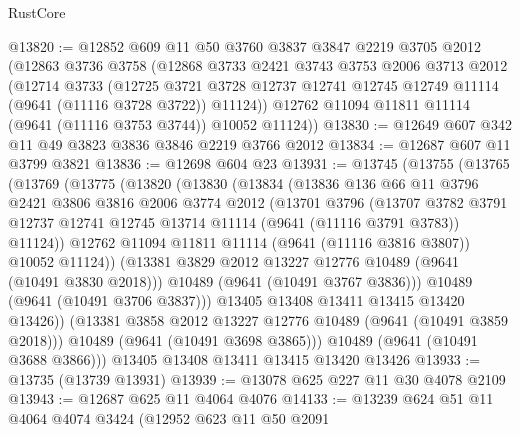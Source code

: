 \begin{lexlean}{RustCore}
\begin{coremodule}
@13820 := @12852
    @609
    @11
    @50
    @3760
    @3837
    @3847
    @2219
    @3705
    @2012
    (@12863
      @3736
      @3758
      (@12868
        @3733
        @2421
        @3743
        @3753
        @2006
        @3713
        @2012
        (@12714
          @3733
          (@12725
            @3721
            @3728
            @12737
            @12741
            @12745
            @12749
            @11114
            (@9641 (@11116 @3728 @3722))
            @11124))
        @12762
        @11094
        @11811
        @11114
        (@9641 (@11116 @3753 @3744))
        @10052
        @11124))
@13830 := @12649 @607 @342 @11 @49 @3823 @3836 @3846 @2219 @3766 @2012
@13834 := @12687 @607 @11 @3799 @3821
@13836 := @12698 @604 @23
@13931 := @13745
    (@13755
      (@13765
        (@13769
          (@13775
            (@13820
              (@13830
                (@13834
                  (@13836
                    @136
                    @66
                    @11
                    @3796
                    @2421
                    @3806
                    @3816
                    @2006
                    @3774
                    @2012
                    (@13701
                      @3796
                      (@13707
                        @3782
                        @3791
                        @12737
                        @12741
                        @12745
                        @13714
                        @11114
                        (@9641 (@11116 @3791 @3783))
                        @11124))
                    @12762
                    @11094
                    @11811
                    @11114
                    (@9641 (@11116 @3816 @3807))
                    @10052
                    @11124))
                (@13381 @3829 @2012 @13227 @12776 @10489 (@9641 (@10491 @3830 @2018)))
                @10489
                (@9641 (@10491 @3767 @3836)))
              @10489
              (@9641 (@10491 @3706 @3837)))
            @13405
            @13408
            @13411
            @13415
            @13420
            @13426))
        (@13381 @3858 @2012 @13227 @12776 @10489 (@9641 (@10491 @3859 @2018)))
        @10489
        (@9641 (@10491 @3698 @3865)))
      @10489
      (@9641 (@10491 @3688 @3866)))
    @13405
    @13408
    @13411
    @13415
    @13420
    @13426
@13933 := @13735 (@13739 @13931)
@13939 := @13078 @625 @227 @11 @30 @4078 @2109
@13943 := @12687 @625 @11 @4064 @4076
@14133 := @13239
    @624
    @51
    @11
    @4064
    @4074
    @3424
    (@12952
      @623
      @11
      @50
      @2091

\end{coremodule}
\end{lexlean}
